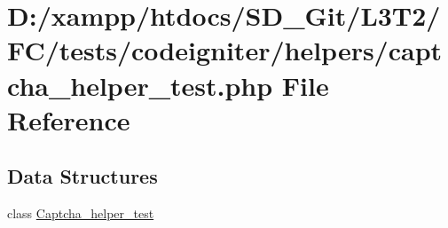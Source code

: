 \hypertarget{tests_2codeigniter_2helpers_2captcha__helper__test_8php}{}\section{D\+:/xampp/htdocs/\+S\+D\+\_\+\+Git/\+L3\+T2/\+F\+C/tests/codeigniter/helpers/captcha\+\_\+helper\+\_\+test.php File Reference}
\label{tests_2codeigniter_2helpers_2captcha__helper__test_8php}
\subsection*{Data Structures}
\begin{DoxyCompactItemize}
\item 
class \hyperlink{class_captcha__helper__test}{Captcha\+\_\+helper\+\_\+test}
\end{DoxyCompactItemize}
